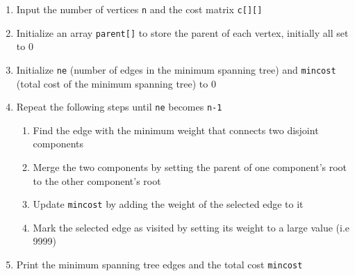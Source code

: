 \begin{enumerate}[label=Step \arabic* : ,itemindent=1.5em]
		\item Input the number of vertices \texttt{n} and the cost matrix \texttt{c[][]}
		\item Initialize an array \texttt{parent[]} to store the parent of each vertex,
			initially all set to 0
		\item Initialize \texttt{ne} (number of edges in the minimum spanning tree) and
			\texttt{mincost} (total cost of the minimum spanning tree) to 0
		\item Repeat the following steps until \texttt{ne} becomes \texttt{n-1}
			\begin{enumerate}[label=\alph*) ]
				\item Find the edge with the minimum weight that connects two disjoint
					components
				\item Merge the two components by setting the parent of one component's
					root to the other component's root
				\item Update \texttt{mincost} by adding the weight of the selected edge
					to it
				\item Mark the selected edge as visited by setting its weight to a
					large value (i.e 9999)
			\end{enumerate}
		\item Print the minimum spanning tree edges and the total cost \texttt{mincost}
	\end{enumerate}
